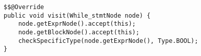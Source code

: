 \begin{lstlisting}[caption={Visit for a while statement node in the type checker.}, label={code:TC:while}]
$$@Override
public void visit(While_stmtNode node) {
    node.getExprNode().accept(this);
    node.getBlockNode().accept(this);
    checkSpecificType(node.getExprNode(), Type.BOOL);
}
\end{lstlisting}